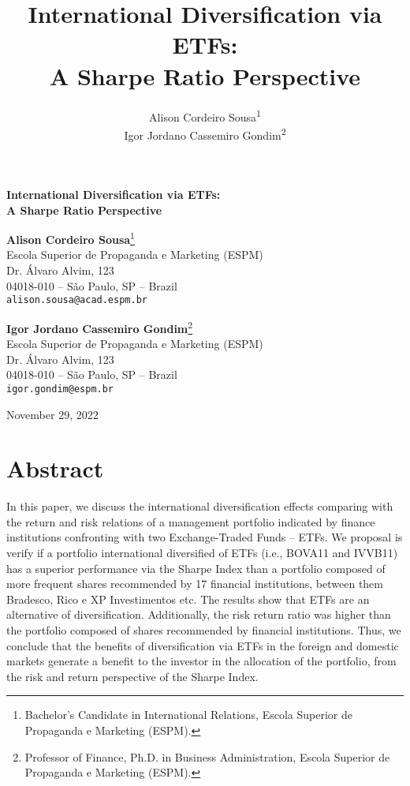 \documentclass{article}
\title{International Diversification via ETFs: \\ A Sharpe Ratio Perspective}
\author{
    Alison Cordeiro Sousa\textsuperscript{1} \\
    Igor Jordano Cassemiro Gondim\textsuperscript{2}
}
\date{}
\begin{document}
\fontsize{12pt}{18pt}\selectfont

\begin{center}
{\LARGE \textbf{International Diversification via ETFs: \\ A Sharpe Ratio Perspective}}

\vspace{1.5cm}

\textbf{Alison Cordeiro Sousa}\footnote{Bachelor’s Candidate in International Relations, Escola Superior de Propaganda e Marketing (ESPM).}\\
Escola Superior de Propaganda e Marketing (ESPM)\\
Dr. Álvaro Alvim, 123\\
04018-010 – São Paulo, SP – Brazil\\
\texttt{alison.sousa@acad.espm.br}

\vspace{1cm}

\textbf{Igor Jordano Cassemiro Gondim}\footnote{Professor of Finance, Ph.D. in Business Administration, Escola Superior de Propaganda e Marketing (ESPM).}\\
Escola Superior de Propaganda e Marketing (ESPM)\\
Dr. Álvaro Alvim, 123\\
04018-010 – São Paulo, SP – Brazil\\
\texttt{igor.gondim@espm.br}

\vspace{1.5cm}

November 29, 2022
\end{center}

\thispagestyle{empty}

\newpage
\section*{Abstract}
In this paper, we discuss the international diversification effects comparing with the return and risk relations of a management portfolio indicated by finance institutions confronting with two Exchange-Traded Funds – ETFs. We proposal is verify if a portfolio international diversified of ETFs (i.e., BOVA11 and IVVB11) has a superior performance via the Sharpe Index than a portfolio composed of more frequent shares recommended by 17 financial institutions, between them Bradesco, Rico e XP Investimentos etc. The results show that ETFs are an alternative of diversification. Additionally, the risk return ratio was higher than the portfolio composed of shares recommended by financial institutions. Thus, we conclude that the benefits of diversification via ETFs in the foreign and domestic markets generate a benefit to the investor in the allocation of the portfolio, from the risk and return perspective of the Sharpe Index.
\end{document}
